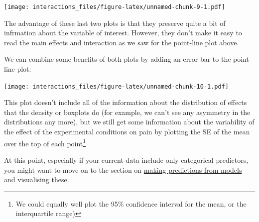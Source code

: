 \documentclass[]{article}
\newenvironment{Shaded}{\begin{snugshade}}{\end{snugshade}}
\newcommand{\KeywordTok}[1]{\textcolor[rgb]{0.13,0.29,0.53}{\textbf{#1}}}
\newcommand{\DataTypeTok}[1]{\textcolor[rgb]{0.13,0.29,0.53}{#1}}
\newcommand{\StringTok}[1]{\textcolor[rgb]{0.31,0.60,0.02}{#1}}
\newcommand{\OperatorTok}[1]{\textcolor[rgb]{0.81,0.36,0.00}{\textbf{#1}}}
\newcommand{\NormalTok}[1]{#1}
\let\rmarkdownfootnote\footnote%
\def\footnote{\protect\rmarkdownfootnote}
\theoremstyle{definition}
\theoremstyle{definition}
\theoremstyle{definition}
\theoremstyle{remark}
\begin{document}
\texttt{[image: interactions\_files/figure-latex/unnamed-chunk-9-1.pdf]}

The advantage of these last two plots is that they preserve quite a bit
of infrmation about the variable of interest. However, they don't make
it easy to read the main effects and interaction as we saw for the
point-line plot above.

We can combine some benefits of both plots by adding an error bar to the
point-line plot:

\begin{Shaded}
\end{Shaded}

\texttt{[image: interactions\_files/figure-latex/unnamed-chunk-10-1.pdf]}

This plot doesn't include all of the information about the distribution
of effects that the density or boxplots do (for example, we can't see
any asymmetry in the distributions any more), but we still get some
information about the variability of the effect of the experimental
conditions on pain by plotting the SE of the mean over the top of each
point\footnote{We could equally well plot the 95\% confidence interval
  for the mean, or the interquartile range)}

At this point, especially if your current data include only categorical
predictors, you might want to move on to the section on
\href{predictions-and-margins.html}{making predictions from models} and
visualising these.
\end{document}
